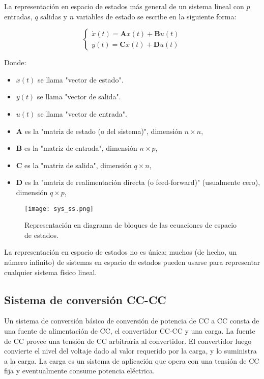 La representación en espacio de estados más general de un sistema lineal con \( p \) entradas, \( q \) salidas y \( n \)
variables de estado se escribe en la siguiente forma:

\vspace{-0.5cm}
\begin{equation}
    \begin{cases}
        \dot{x}(t) = \textbf{A} x(t) + \textbf{B} u(t) \\
        y(t) = \textbf{C} x(t) + \textbf{D} u(t)
    \end{cases}
\end{equation}
\vspace{-0.5cm}

Donde:

\begin{itemize}[noitemsep]
    \item \( x(t) \) se llama "vector de estado".
    \item \( y(t) \) se llama "vector de salida".
    \item \( u(t) \) se llama "vector de entrada".
    \item \( \textbf{A} \) es la "matriz de estado (o del sistema)", dimensión \( n \times n \),
    \item \( \textbf{B} \) es la "matriz de entrada", dimensión \( n \times p \),
    \item \( \textbf{C} \) es la "matriz de salida", dimensión \( q \times n \),
    \item \( \textbf{D} \) es la "matriz de realimentación directa (o feed-forward)" (usualmente cero), dimensión \( q \times p \),
\end{itemize}

\begin{figure}[H]
    \centering
    \texttt{[image: sys\_ss.png]}
    \vspace{-0.25cm}
    \caption{Representación en diagrama de bloques de las ecuaciones de espacio de estados.}
    \label{fig:sys_ss}
\end{figure}
\vspace{-0.5cm}

La representación en espacio de estados no es única; muchos (de hecho, un número infinito) de sistemas en espacio de estados pueden usarse para representar cualquier sistema físico lineal.

\vspace{-0.5cm}
\subsection{\textbf{Sistema de conversión CC-CC}}
\vspace{-0.5cm}
Un sistema de conversión básico de conversión de potencia de CC a CC consta de una fuente de alimentación de CC, el convertidor CC-CC y una carga.
La fuente de CC provee una tensión de CC arbitraria al convertidor. El convertidor luego convierte el nivel del voltaje dado al valor requerido
por la carga, y lo suministra a la carga. La carga es un sistema de aplicación que opera con una tensión de CC fija y eventualmente consume potencia
eléctrica.

